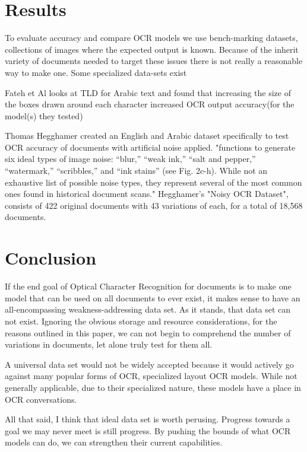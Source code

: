 \documentclass[sigplan,screen,nonacm]{acmart-tagged}
\begin{document}
\section{Results}
\label{sec:Results}

To evaluate accuracy and compare OCR models we use bench-marking datasets, collections of images where the expected output is known. Because of the inherit variety of documents needed to target these issues there is not really a reasonable way to make one. Some specialized data-sets exist \cite{Fateh:2024,Hegghamer:2022}

Fateh et Al\citep{Fateh:2024} looks at TLD for Arabic text and found that increasing the size of the boxes drawn around each character increased OCR output accuracy(for the model(s) they tested)

Thomas Hegghamer created an English and Arabic dataset specifically to test OCR accuracy of documents with artificial noise applied. "functions to generate six ideal types of image noise: “blur,” “weak ink,” “salt and pepper,” “watermark,” “scribbles,” and “ink stains” (see Fig. 2c-h). While not an exhaustive list of possible noise types, they represent several of the most common ones found in historical document scans."\citep{Hegghamer:2022} Hegghamer's "Noisy OCR Dataset", consists of 422 original documents with 43 variations of each, for a total of 18,568 documents.

\section{Conclusion}
\label{Conclusion}

If the end goal of Optical Character Recognition for documents is to make one model that can be used on all documents to ever exist, it makes sense to have an all-encompassing weakness-addressing data set. As it stands, that data set can not exist. Ignoring the obvious storage and resource considerations, for the reasons outlined in this paper, we can not begin to comprehend the number of variations in documents, let alone truly test for them all. 

A universal data set would not be widely accepted because it would actively go against many popular forms of OCR, specialized layout OCR models. While not generally applicable, due to their specialized nature, these models have a place in OCR conversations.

All that said, I think that ideal data set is worth perusing. Progress towards a goal we may never meet is still progress. By pushing the bounds of what OCR models can do, we can strengthen their current capabilities.
\end{document}
